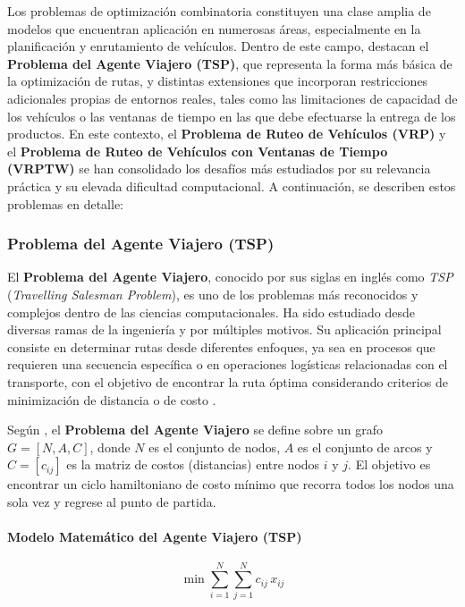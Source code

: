 \documentclass[12pt,titlepage,twoside,openright]{book}
\begin{document}
Los problemas de optimización combinatoria constituyen una clase amplia de modelos que encuentran aplicación en numerosas áreas, especialmente en la planificación y enrutamiento de vehículos. Dentro de este campo, destacan el \textbf{Problema del Agente Viajero (TSP)}, que representa la forma más básica de la optimización de rutas, y distintas extensiones que incorporan restricciones adicionales propias de entornos reales, tales como las limitaciones de capacidad de los vehículos o las ventanas de tiempo en las que debe efectuarse la entrega de los productos. En este contexto, el \textbf{Problema de Ruteo de Vehículos (VRP)} y el \textbf{Problema de Ruteo de Vehículos con Ventanas de Tiempo  (VRPTW)}  se han consolidado los desafíos más estudiados por su relevancia práctica y su elevada dificultad computacional. A continuación, se describen estos problemas en detalle:


\subsubsection{Problema del Agente Viajero (TSP)}
\label{subsec:problem_tsp}

El \textbf{Problema del Agente Viajero}, conocido por sus siglas en inglés como \textit{TSP} (\emph{Travelling Salesman Problem}), es uno de los problemas más reconocidos y complejos dentro de las ciencias computacionales. Ha sido estudiado desde diversas ramas de la ingeniería y por múltiples motivos. Su aplicación principal consiste en determinar rutas desde diferentes enfoques, ya sea en procesos que requieren una secuencia específica o en operaciones logísticas relacionadas con el transporte, con el objetivo de encontrar la ruta óptima considerando criterios de minimización de distancia o de costo \citep{lopez2014tabu}.

Según \citep{torres2018}, el \textbf{Problema del Agente Viajero} se define sobre un grafo \(G = [N,A,C]\), donde \(N\) es el conjunto de nodos, \(A\) es el conjunto de arcos y \(C = [c_{ij}]\) es la matriz de costos (distancias) entre nodos \(i\) y \(j\). El objetivo es encontrar un ciclo hamiltoniano de costo mínimo que recorra todos los nodos una sola vez y regrese al punto de partida.

\paragraph{Modelo Matemático del Agente Viajero (TSP)}

\begin{equation}
	\min \sum_{i=1}^N \sum_{j=1}^N c_{ij}\,x_{ij}
	\label{eq:TSP_obj}
\end{equation}
\end{document}
